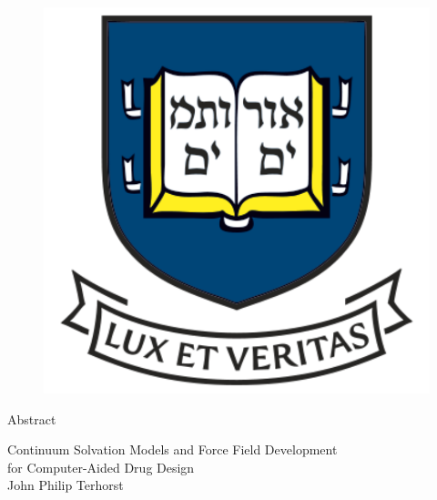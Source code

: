 \documentclass[12pt]{report}
\begin{document}

\newpage
\vspace*{5cm}
\begin{figure}[ht]
     \centering
     \includegraphics[scale=0.5]{figures/pdf/yalelogo.pdf}
\end{figure}
\newpage



\begin{center}
\begin{singlespace}

                       Abstract \\                             \bigskip

Continuum Solvation Models and Force Field Development \\
             for Computer-Aided Drug Design \\

                                                               \bigskip
                 John Philip Terhorst \\
                         
\end{singlespace}
\end{center}
\end{document}
